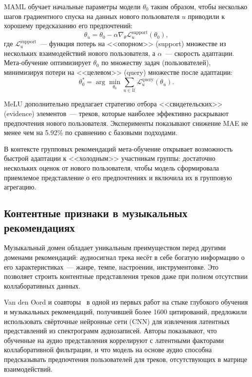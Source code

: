 MAML обучает начальные параметры модели $\theta_0$ таким образом, чтобы несколько шагов градиентного спуска на данных нового пользователя $u$ приводили к хорошему предсказанию его предпочтений:
\begin{equation}
    \theta_u = \theta_0 - \alpha \nabla_\theta \mathcal{L}_u^{\mathrm{support}}(\theta_0),
\end{equation}
где $\mathcal{L}_u^{\mathrm{support}}$~--- функция потерь на <<опорном>> (support) множестве из нескольких взаимодействий нового пользователя, а $\alpha$~--- скорость адаптации. Мета-обучение оптимизирует $\theta_0$ по множеству задач (пользователей), минимизируя потери на <<целевом>> (query) множестве после адаптации:
\begin{equation}
    \theta_0^* = \arg\min_{\theta_0} \sum_{u \in \mathcal{U}} \mathcal{L}_u^{\mathrm{query}}(\theta_u).
\end{equation}

MeLU дополнительно предлагает стратегию отбора <<свидетельских>> (evidence) элементов~--- треков, которые наиболее эффективно раскрывают предпочтения нового пользователя. Эксперименты показывают снижение MAE не менее чем на 5.92\% по сравнению с базовыми подходами.

В контексте групповых рекомендаций мета-обучение открывает возможность быстрой адаптации к <<холодным>> участникам группы: достаточно нескольких оценок от нового пользователя, чтобы модель сформировала приемлемое представление о его предпочтениях и включила их в групповую агрегацию.

\subsection{Контентные признаки в музыкальных рекомендациях}

Музыкальный домен обладает уникальным преимуществом перед другими доменами рекомендаций: аудиосигнал трека несёт в себе богатую информацию о его характеристиках~--- жанре, темпе, настроении, инструментовке. Это позволяет строить контентные представления треков даже при полном отсутствии коллаборативных данных.

Van den Oord и соавторы~\cite{vandeoord2013deep_music} в одной из первых работ на стыке глубокого обучения и музыкальных рекомендаций, получившей более 1600 цитирований, предложили использовать свёрточные нейронные сети (CNN) для извлечения латентных представлений из спектрограмм аудиозаписей. Авторы показывают, что обученные на аудио представления коррелируют с латентными факторами коллаборативной фильтрации, и что модель на основе аудио способна предсказывать предпочтения пользователей для треков, отсутствующих в матрице взаимодействий.

